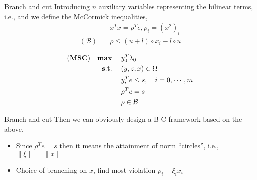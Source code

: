 \begin{frame}{Branch and cut}
  Introducing \(n\) auxiliary variables representing the bilinear terms, i.e., and we define the McCormick inequalities,
  \begin{align}
                       & x^Tx = \rho^Te, \rho_i = (x^2)_i     \\
    (\mathcal B) \quad & \rho \leq (u+l)\circ x_i - l \circ u \\
  \end{align}
  \begin{align}
    (\textbf{MSC}) \quad \mathbf{max}\;\quad & y_0 ^T\lambda_0                    \\
    \mathbf{s.t.}\; \quad                  & (y,z,x) \in \Omega                 \\
                               & y_i^Te \le s, \quad i=0, \cdots, m \\
                               & \rho^Te = s                        \\
                               & \rho \in \mathcal B
  \end{align}
\end{frame}
\begin{frame}{Branch and cut}
  Then we can obviously design a B-C framework based on the above.
  \begin{itemize}
    \item Since \(\rho^Te = s\) then it means the attainment of norm ``circles'', i.e., \(\|\xi\| = \|x\|\)
    \item Choice of branching on \(x\), find most violation \(\rho_i - \xi_i x_i\)
  \end{itemize}
\end{frame}
\begin{frame}
  \scriptsize
  \printbibliography
\end{frame}
